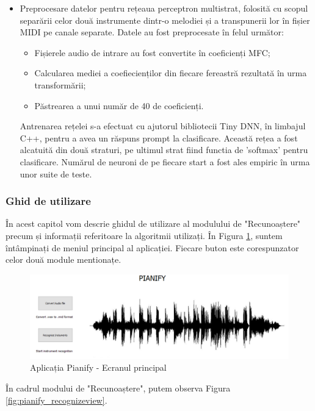 \documentclass[a4paper,12pt]{report}
\begin{document}
\begin{itemize}
   	\item Preprocesare datelor pentru rețeaua perceptron multistrat, folosită cu scopul separării celor două instrumente dintr-o melodiei și a transpunerii lor în fișier MIDI pe canale separate. Datele au fost preprocesate în felul următor: 
	   \begin{itemize}
	   		\item Fișierele audio de intrare au fost convertite în coeficienți MFC;
	   		\item Calcularea mediei a coefiecienților din fiecare fereastră rezultată în urma transformării;
	   		\item Păstrearea a unui număr de 40 de coeficienți.
	   \end{itemize}
   Antrenarea rețelei s-a efectuat cu ajutorul bibliotecii Tiny DNN, în limbajul C++, pentru a avea un răspuns prompt la clasificare. Această rețea a fost alcatuită din două straturi, pe ultimul strat fiind functia de 'softmax' pentru clasificare. Numărul de neuroni de pe fiecare start a fost ales empiric în urma unor suite de teste.
\end{itemize}
   \subsubsection{Ghid de utilizare} 
   În acest capitol vom descrie ghidul de utilizare al modulului de "Recunoaștere" precum și informații referitoare la algoritmii utilizați.
   În Figura \ref{fig:pianify_mainwindow}, suntem întâmpinați de meniul principal al aplicației. Fiecare buton este corespunzator celor două module mentionațe.
   
   \begin{figure}[H]
   		\begin{center}
   		\includegraphics[scale=0.4]{images/pianify_mainwindow.PNG}
   		\end{center}
   		\caption{Aplicația Pianify - Ecranul principal }
   		\label{fig:pianify_mainwindow}
   \end{figure}
   
  În cadrul modului de "Recunoaștere", putem observa Figura \ref{fig:pianify_recognizeview}. 
   
\end{document}
